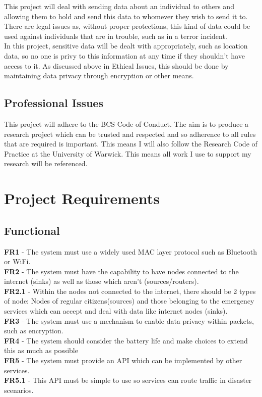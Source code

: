 \documentclass{report}
\begin{document}
This project will deal with sending data about an individual to others and allowing them to hold and send this 
data to whomever they wish to send it to. There are legal issues as, without proper protections, this kind of 
data could be used against individuals that are in trouble, such as in a terror incident. 
\bigskip
\\
In this project, sensitive data will be dealt with appropriately, such as location data, so no one is privy to this 
information at any time if they shouldn't have access to it. As discussed above in Ethical Issues, this should be 
done by maintaining data privacy through encryption or other means.

\section*{Professional Issues}

This project will adhere to the BCS Code of Conduct\cite{BCSCoP}. The aim is to produce a 
research project which can be trusted and respected and so adherence to all rules that are required 
is important. This means I will also follow the Research Code of Practice at the University of Warwick\cite{UniWarwickCOP}. 
This means all work I use to support my research will be referenced. 

\chapter*{Project Requirements}

\section*{Functional}

\textbf{FR1} - The system must use a widely used MAC layer protocol such as Bluetooth or WiFi.\\
\textbf{FR2} - The system must have the capability to have nodes connected to the internet (sinks) as well as those which aren't (sources/routers).\\
\textbf{FR2.1} - Within the nodes not connected to the internet, there should be 2 types of node: Nodes of regular citizens(sources) and those belonging to the emergency services 
which can accept and deal with data like internet nodes (sinks).\\
\textbf{FR3} - The system must use a mechanism to enable data privacy within packets, such as encryption.\\
\textbf{FR4} - The system should consider the battery life and make choices to extend this as much as possible\\
\textbf{FR5} - The system must provide an API which can be implemented by other services.\\
\textbf{FR5.1} - This API must be simple to use so services can route traffic in disaster scenarios.\\
\end{document}
